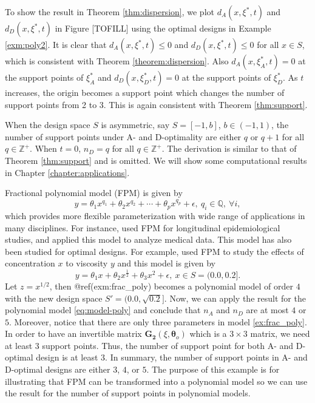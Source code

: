 \documentclass[
]{book}
\theoremstyle{definition}
\theoremstyle{definition}
\theoremstyle{definition}
\theoremstyle{definition}
\theoremstyle{remark}
\begin{document}
To show the result in Theorem \ref{thm:dispersion}, we plot \(d_A(x,\xi^*,t)\) and \(d_D(x,\xi^*,t)\) in Figure {[}TOFILL{]} using the optimal designs in Example \ref{exm:poly2}. It is clear that \(d_A(x,\xi^*,t) \leq 0\) and \(d_D(x,\xi^*,t)\leq 0\) for all \(x\in S\), which is consistent with Theorem \ref{theorem:dispersion}. Also \(d_A(x,\xi_A^*,t)=0\) at the support points of \(\xi_A^*\) and \(d_D(x,\xi_D^*,t)=0\) at the support points of \(\xi_D^*\). As \(t\) increases, the origin becomes a support point which changes the number of support points from 2 to 3. This is again consistent with Theorem \ref{thm:support}.

When the design space \(S\) is asymmetric, say \(S=[-1,b]\), \(b\in(-1,1)\), the number of support points under A- and D-optimality are either \(q\) or \(q+1\) for all \(q\in \mathbb{Z^+}\). When \(t=0\), \(n_D=q\) for all \(q\in\mathbb{Z^+}\). The derivation is similar to that of Theorem \ref{thm:support} and is omitted. We will show some computational results in Chapter \ref{chapter:applications}.

Fractional polynomial model (FPM) is given by
\begin{equation}
 y=\theta_1x^{q_1}+\theta_2x^{q_2}+\cdots+\theta_px^{q_p}+\epsilon,~q_i\in\mathbb{Q},~\forall i,
 \label{eq:model-frac-poly}
\end{equation}
which provides more flexible parameterization with wide range of applications in many disciplines. For instance, \citet{cui2009fractional} used FPM for longitudinal epidemiological studies, and \citet{royston1995regression} applied this model to analyze medical data. This model has also been studied for optimal designs. For example, \citet{torsney995minimally} used FPM to study the effects of concentration \(x\) to viscosity \(y\) and this model is given by
\begin{equation}
    y=\theta_1x+\theta_2x^{\frac{1}{2}}+\theta_3x^2+\epsilon,~x\in S=(0.0,0.2].
    \label{eq:ex-frac-poly}
\end{equation}
Let \(z=x^{1/2}\), then @ref(exm:frac\_poly) becomes a polynomial model of order \(4\) with the new design space \(S'=(0.0,\sqrt{0.2}]\). Now, we can apply the result for the polynomial model \eqref{eq:model-poly} and conclude that \(n_A\) and \(n_D\) are at most \(4\) or \(5\). Moreover, notice that there are only three parameters in model \eqref{ex:frac_poly}. In order to have an invertible matrix \(\boldsymbol{G_2}(\xi,\boldsymbol{\theta}_o)\) which is a \(3\times 3\) matrix, we need at least \(3\) support points. Thus, the number of support point for both A- and D-optimal design is at least 3. In summary, the number of support points in A- and D-optimal designs are either \(3\), \(4\), or \(5\). The purpose of this example is for illustrating that FPM can be transformed into a polynomial model so we can use the result for the number of support points in polynomial models.
\end{document}

